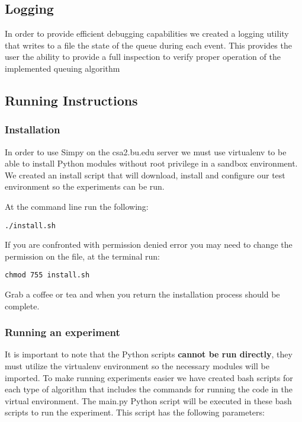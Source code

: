 \subsection{Logging}

In order to provide efficient debugging capabilities we created a logging utility that writes to a file the state of the queue during each event. This provides the user the ability to provide a full inspection to verify proper operation of the implemented queuing algorithm

\subsection{Running Instructions}

\subsubsection{Installation}
In order to use Simpy on the csa2.bu.edu server we must use virtualenv to be able to install Python modules without root privilege in a sandbox environment. We created an install script that will download, install and configure our test environment so the experiments can be run.

At the command line run the following:

\begin{lstlisting}
./install.sh
\end{lstlisting}

If you are confronted with permission denied error you may need to change the permission on the file, at the terminal run:

\begin{lstlisting}
chmod 755 install.sh
\end{lstlisting}

Grab a coffee or tea and when you return the installation process should be complete. 

\subsubsection{Running an experiment}
It is important to note that the Python scripts \textbf{cannot be run directly}, they must utilize the virtualenv environment so the necessary modules will be imported. To make running experiments easier we have created bash scripts for each type of algorithm that includes the commands for running the code in the virtual environment. The main.py Python script will be executed in these bash scripts to run the experiment. This script has the following parameters:

